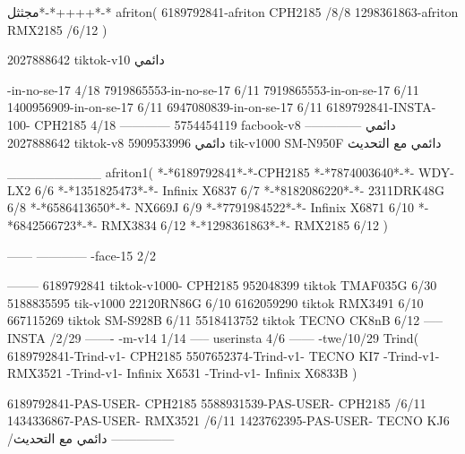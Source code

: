 مجثثل*-*++++*-*
afriton(
6189792841-afriton CPH2185  /8/8
1298361863-afriton RMX2185  /6/12
)

2027888642 tiktok-v10
دائمي

-in-no-se-17 4/18
7919865553-in-no-se-17 6/11
7919865553-in-on-se-17 6/11
1400956909-in-on-se-17 6/11
6947080839-in-on-se-17 6/11
6189792841-INSTA-100- CPH2185 4/18
------------
5754454119 facbook-v8
دائمي
--------------
2027888642 tiktok-v8
دائمي
5909533996 tik-v1000  SM-N950F
دائمي مع التحديث

__________
afriton1(
*-*6189792841*-*-CPH2185
*-*7874003640*-*- WDY-LX2  6/6
*-*1351825473*-*- Infinix X6837  6/7
*-*8182086220*-*- 2311DRK48G  6/8
*-*6586413650*-*- NX669J  6/9
*-*7791984522*-*- Infinix X6871  6/10
*-*6842566723*-*- RMX3834  6/12
*-*1298361863*-*- RMX2185  6/12
)


------
------------
-face-15 2/2

--------
6189792841 tiktok-v1000- CPH2185 
952048399 tiktok TMAF035G  6/30
5188835595 tik-v1000 22120RN86G  6/10
6162059290 tiktok RMX3491  6/10
667115269 tiktok  SM-S928B  6/11
5518413752 tiktok  TECNO CK8nB  6/12
-----
 INSTA /2/29
-------
-m-v14 1/14
-----
userinsta 4/6
------
-twe/10/29
Trind(
6189792841-Trind-v1- CPH2185 
5507652374-Trind-v1- TECNO KI7 \6-Trind-v1- RMX3521 \6-Trind-v1-  Infinix X6531 \6-Trind-v1-   Infinix X6833B \6
)


6189792841-PAS-USER- CPH2185 
5588931539-PAS-USER- CPH2185  /6/11
1434336867-PAS-USER- RMX3521  /6/11
1423762395-PAS-USER- TECNO KJ6  /دائمي مع التحديث
    ---------------
